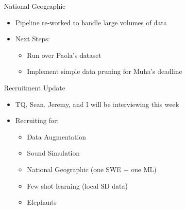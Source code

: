 \begin{frame}{National Geographic}
    \begin{itemize}
        \item Pipeline re-worked to handle large volumes of data
        \item Next Steps:
        \begin{itemize}
            \item Run over Paola's dataset
            \item Implement simple data pruning for Muha's deadline
        \end{itemize}
    \end{itemize} 
\end{frame}

\begin{frame}{Recruitment Update}
    \begin{itemize}
        \item TQ, Sean, Jeremy, and I will be interviewing this week
        \item Recruiting for:
        \begin{itemize}
            \item Data Augmentation
            \item Sound Simulation
            \item National Geographic (one SWE + one ML)
            \item Few shot learning (local SD data)
            \item Elephants
        \end{itemize}
    \end{itemize}
\end{frame}
